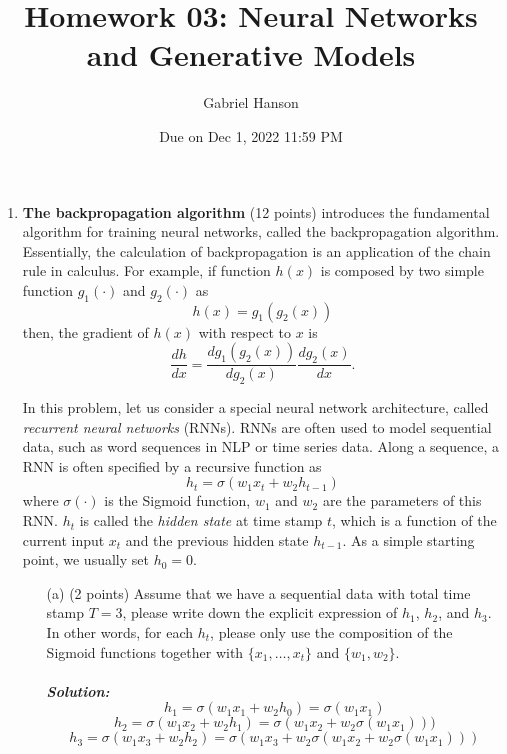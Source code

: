 \documentclass[10pt]{article}
\title{Homework 03: Neural Networks and Generative Models}
\author{Gabriel Hanson}
\date{Due on Dec 1, 2022 11:59 PM}
\begin{document}
 
\maketitle

\begin{enumerate}
\item \textbf{The backpropagation algorithm} (12 points) introduces the fundamental algorithm for training neural networks, called the backpropagation algorithm. Essentially, the calculation of backpropagation is an application of the chain rule in calculus. For example, if function $h(x)$ is composed by two simple function $g_1(\cdot)$ and $g_2(\cdot)$ as
  \begin{equation}
    h(x) = g_1(g_2(x))
  \end{equation}
  then, the gradient of $h(x)$ with respect to $x$ is
  \begin{equation}
    \frac{d h}{d x} = \frac{d g_1(g_2(x))}{d g_2(x)}\frac{d g_2(x)}{d x}.
  \end{equation}

  In this problem, let us consider a special neural network architecture, called \emph{recurrent neural networks} (RNNs).
  RNNs are often used to model sequential data, such as word sequences in NLP or time series data.
  Along a sequence, a RNN is often specified by a recursive function as 
  \begin{equation}
    h_t = \sigma(w_1x_t + w_2h_{t-1})
  \end{equation}
  where $\sigma(\cdot)$ is the Sigmoid function, $w_1$ and $w_2$ are the parameters of this RNN.  $h_t$ is called the \emph{hidden state} at time stamp $t$, which is a function of the current input $x_t$ and the previous hidden state $h_{t-1}$.
  As a simple starting point, we usually set $h_0=0$.
  \begin{itemize}
  \item[(a)] (2 points) Assume that we have a sequential data with total time stamp $T=3$, please write down the explicit expression of $h_1$, $h_2$, and $h_3$. In other words, for each $h_t$, please only use the composition of the Sigmoid functions together with $\{x_1,\dots,x_t\}$ and $\{w_1,w_2\}$. \\ \\ 
  \hspace{\parindent}\textit{\textbf{Solution:}}
$$  h_1 = \sigma(w_1x_1 + w_2h_0) =  \sigma(w_1 x_1 ) $$ 
$$  h_2 = \sigma(w_1x_2 + w_2h_1) =  \sigma(w_1 x_2 + w_2 \sigma(w_1 x_1))) $$ 
$$ h_3 =  \sigma(w_1x_3 + w_2h_2) =  \sigma(w_1 x_3 + w_2 \sigma(w_1 x_2  + w_2 \sigma(w_1 x_1))) $$ 
  

\end{itemize}
\end{enumerate}
\end{document}
